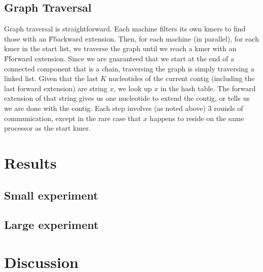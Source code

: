 \documentclass{article}
\begin{document}
\subsection{Graph Traversal}
Graph traversal is straightforward.  Each machine filters its own kmers to find those with an \'F\' backward extension.  Then, for each machine (in parallel), for each kmer in the start list, we traverse the graph until we reach a kmer with an \'F\' forward extension.  Since we are guaranteed that we start at the end of a connected component that is a chain, traversing the graph is simply traversing a linked list.  Given that the last $K$ nucleotides of the current contig (including the last forward extension) are string $x$, we look up $x$ in the hash table.  The forward extension of that string gives us one nucleotide to extend the contig, or tells us we are done with the contig.  Each step involves (as noted above) 3 rounds of communication, except in the rare case that $x$ happens to reside on the same processor as the start kmer.

\section{Results}
\subsection{Small experiment}
\subsection{Large experiment}

\section{Discussion}
\end{document}

